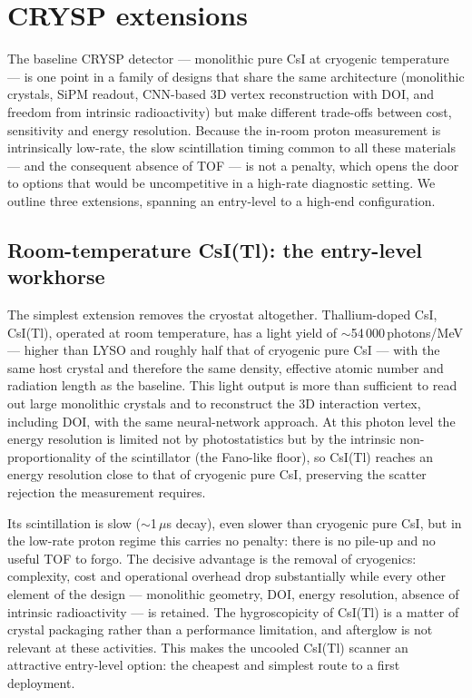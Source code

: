 \documentclass{iopjournal}
\begin{document}
\section{CRYSP extensions}
\label{sec:extensions}

The baseline CRYSP detector --- monolithic pure CsI at cryogenic temperature
--- is one point in a family of designs that share the same architecture
(monolithic crystals, SiPM readout, CNN-based 3D vertex reconstruction with DOI,
and freedom from intrinsic radioactivity) but make different trade-offs between
cost, sensitivity and energy resolution. Because the in-room proton measurement
is intrinsically low-rate, the slow scintillation timing common to all these
materials --- and the consequent absence of TOF --- is not a penalty, which
opens the door to options that would be uncompetitive in a high-rate diagnostic
setting. We outline three extensions, spanning an entry-level to a high-end
configuration.

\subsection{Room-temperature CsI(Tl): the entry-level workhorse}
\label{sec:csitl}

The simplest extension removes the cryostat altogether. Thallium-doped CsI,
CsI(Tl), operated at room temperature, has a light yield of
$\sim$54\,000\,photons/MeV --- higher than LYSO and roughly half that of
cryogenic pure CsI --- with the same host crystal and therefore the same
density, effective atomic number and radiation length as the baseline. This
light output is more than sufficient to read out large monolithic crystals and
to reconstruct the 3D interaction vertex, including DOI, with the same neural-network
approach. At this photon level the energy resolution is limited not by
photostatistics but by the intrinsic non-proportionality of the scintillator (the
Fano-like floor), so CsI(Tl) reaches an energy resolution close to that of
cryogenic pure CsI, preserving the scatter rejection the measurement requires.

Its scintillation is slow ($\sim$1\,$\mu$s decay), even slower than cryogenic
pure CsI, but in the low-rate proton regime this carries no penalty: there is no
pile-up and no useful TOF to forgo. The decisive advantage is the removal of
cryogenics: complexity, cost and operational overhead drop substantially while
every other element of the design --- monolithic geometry, DOI, energy
resolution, absence of intrinsic radioactivity --- is retained. The
hygroscopicity of CsI(Tl) is a matter of crystal packaging rather than a
performance limitation, and afterglow is not relevant at these activities. This
makes the uncooled CsI(Tl) scanner an attractive entry-level option: the cheapest
and simplest route to a first deployment.
\end{document}
